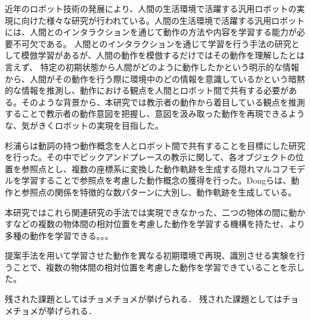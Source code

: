 ﻿近年のロボット技術の発展により、人間の生活環境で活躍する汎用ロボットの実現に向けた様々な研究が行われている。人間の生活環境で活躍する汎用ロボットには、人間とのインタラクションを通じて動作の方法や内容を学習する能力が必要不可欠である。
人間とのインタラクションを通じて学習を行う手法の研究として模倣学習があるが、人間の動作を模倣するだけではその動作を理解したとは言えず、
特定の初期状態から人間がどのように動作したかという明示的な情報から、人間がその動作を行う際に環境中のどの情報を意識しているかという暗黙的な情報を推測し、動作における観点を人間とロボット間で共有する必要がある。そのような背景から、本研究では教示者の動作から着目している観点を推測することで教示者の動作意図を把握し、意図を汲み取った動作を再現できるような、気がきくロボットの実現を目指した。

杉浦らは動詞の持つ動作概念を人とロボット間で共有することを目標にした研究を行った。その中でピックアンドプレースの教示に関して、各オブジェクトの位置を参照点とし、複数の座標系に変換した動作軌跡を生成する隠れマルコフモデルを学習することで参照点を考慮した動作概念の獲得を行った。Dongらは、動作と参照点の関係を特徴的な数パターンに大別し、動作軌跡を生成している。

本研究ではこれら関連研究の手法では実現できなかった、二つの物体の間に動かすなどの複数の物体間の相対位置を考慮した動作を学習する機構を持たせ、より多種の動作を学習できる。。。

提案手法を用いて学習させた動作を異なる初期環境で再現、識別させる実験を行うことで、複数の物体間の相対位置を考慮した動作を学習できていることを示した。

残された課題としてはチョメチョメが挙げられる．
残された課題としてはチョメチョメが挙げられる．
